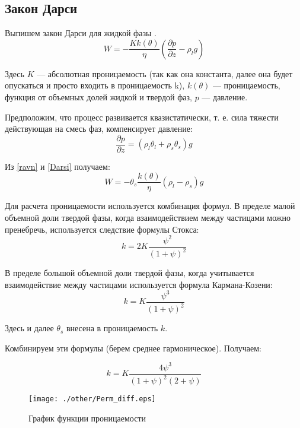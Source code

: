 \documentclass[12pt,a4paper]{article}
\newcommand{\pd}[2]{\frac{\partial #1}{\partial #2}}
\begin{document}
\subsection{Закон Дарси}
Выпишем закон Дарси для жидкой фазы \cite{Kond_mech_2007}.
\begin{equation}
W= -\frac{K k(\theta)}{\eta}\left(\pd{p}{z} - \rho_l g \right)
\label{Darsi}
\end{equation}

Здесь $ K $ --- абсолютная проницаемость (так как она константа, далее она будет опускаться и просто входить в проницаемость k), $k(\theta)$ --- проницаемость, функция от объемных долей жидкой и твердой фаз, $p$ --- давление. 

Предположим, что процесс развивается квазистатически, т. е. сила тяжести действующая на смесь фаз, компенсирует давление:
\begin{equation}
\pd{p}{z} = (\rho_l \theta_l + \rho_s \theta_s)g
\label{ravn}
\end{equation}

Из \eqref{ravn} и \eqref{Darsi} получаем:
\begin{equation}
W= -\theta_s \frac{k(\theta)}{\eta}(\rho_l-\rho_s)g
\label{Darsi_new}
\end{equation}

Для расчета проницаемости используется комбинация формул. В пределе малой объемной доли твердой фазы, когда взаимодействием между частицами можно пренебречь, используется следствие формулы Стокса:
$$
k = 2 K\frac{\psi^2}{(1+\psi)^2} 
$$

В пределе большой объемной доли твердой фазы, когда учитывается взаимодействие между частицами используется формула Кармана-Козени:
$$
k = K\frac{\psi^3}{(1+\psi)^2}
$$

Здесь и далее $\theta_s $ внесена в проницаемость $k$. %

Комбинируем эти формулы (берем среднее гармоническое). Получаем:

\begin{equation}
k = K \frac{4\psi^3}{(1+\psi)^2(2+\psi)}
\label{permability}
\end{equation}

\begin{figure}[h!]
\begin{center}
\texttt{[image: ./other/Perm\_diff.eps]}
\caption{График функции проницаемости}
\end{center}
\end{figure}
\newpage
\end{document}
